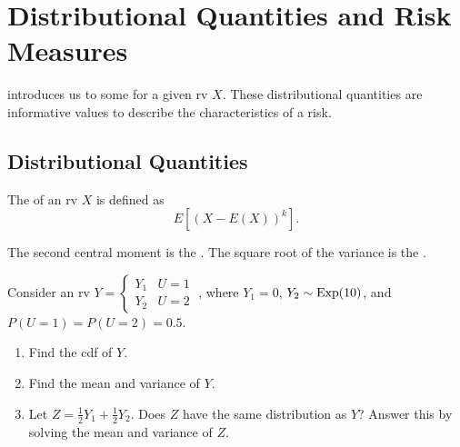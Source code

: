 \documentclass[notoc,notitlepage]{tufte-book}
\begin{document}


\section{Distributional Quantities and Risk Measures}%
\label{sec:distributional_quantities_and_risk_measures}

 introduces us to some  for a given rv $X$. These distributional quantities are informative values to describe the characteristics of a risk.

\subsection{Distributional Quantities}%
\label{sub:distributional_quantities}

\begin{defn}\label{defn:central_moment}
  The  of an rv $X$ is defined as
  \begin{equation*}
    E\left[ {(X - E(X))}^k \right].
  \end{equation*}
\end{defn}

\begin{note}
  The second central moment is the . The square root of the variance is the .
\end{note}

\begin{eg}
  Consider an rv $Y = \begin{cases} Y_1 & U = 1 \\ Y_2 & U = 2 \end{cases} \; $, where $Y_1 = 0$, $Y_2 \sim \operatorname{Exp}(10)$, and $P(U = 1) = P(U = 2) = 0.5$.
  \begin{enumerate}
    \item Find the cdf of $Y$.
    \item Find the mean and variance of $Y$.
    \item Let $Z = \frac{1}{2} Y_1 + \frac{1}{2} Y_2$. Does $Z$ have the same distribution as $Y$? Answer this by solving the mean and variance of $Z$.
  \end{enumerate}
\end{eg}
\end{document}
